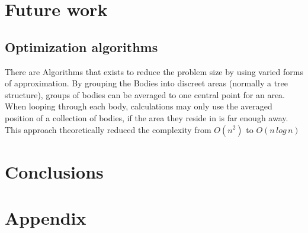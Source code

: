 \documentclass[conference]{acmsiggraph}
\begin{document}
\section{Future work}

\subsection{Optimization algorithms}
There are Algorithms that exists to reduce the problem size by using varied forms of approximation.
By grouping the Bodies into discreet areas (normally a tree structure), groups of bodies can be averaged to one central point for an area. When looping through each body, calculations may only use the averaged position of a collection of bodies, if the area they reside in is far enough away.
This approach theoretically reduced the complexity from $O(n^2)$ to $O(n\,log \,n)$
\cite{1986Natur.324..446B}


\section{Conclusions}





\clearpage
\section{Appendix}
\end{document}
